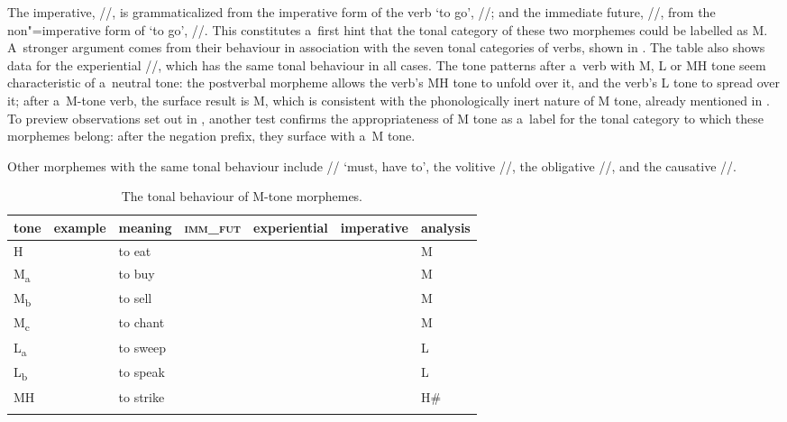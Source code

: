 The {imperative},
//, is grammaticalized from the {imperative} form of the verb ‘to go’, //; and the {immediate future}, //, from the non"={imperative} form of ‘to go’, //. This constitutes a~first hint that the tonal category of these two morphemes could be labelled as M. A~stronger argument comes from their behaviour in association with the seven tonal categories of verbs, shown in . The table also shows data for the experiential //, which has the same tonal behaviour in all cases. The tone patterns after a~verb with M, L or MH tone seem characteristic of a~neutral tone: the postverbal morpheme allows the verb's MH tone to unfold over it, and the verb's L tone to spread over it; after a~M-tone verb, the surface result is M, which is consistent with the phonologically inert nature of M tone, already mentioned in . To preview observations set out in , another test confirms the appropriateness of M tone as a~label for the tonal category to which these morphemes belong: after the {negation} prefix, they surface with a~M tone. 

Other morphemes with the same
tonal behaviour include // ‘must, have to’, the {volitive} //, the {obligative}
//, and the {causative} //.

{\setlength\tabcolsep{5.5pt}
\begin{table}%
\caption{\label{tab:thetonalbehaviourofmtonesuffixes}The tonal behaviour of M-tone morphemes.}
\begin{tabularx}{\textwidth}{ l l l l l Q l }
\lsptoprule
	tone & example & meaning & \textsc{imm\_fut} & experiential & imperative & ana\-lysis\\ \midrule
	H &  & to eat &  &  &  & M\\
	M\textsubscript{a} &  & to buy &  &  &  & M\\
	M\textsubscript{b} &  & to sell &  &  &  & M\\
	M\textsubscript{c} &  & to chant &  &  &  & M\\
	L\textsubscript{a} &  & to sweep &  &  &  & L\\
	L\textsubscript{b} &  & to speak &  &  &  & L\\
	MH &  & to strike &  &  &  & H\#\\
\lspbottomrule
\end{tabularx}
\end{table}}



